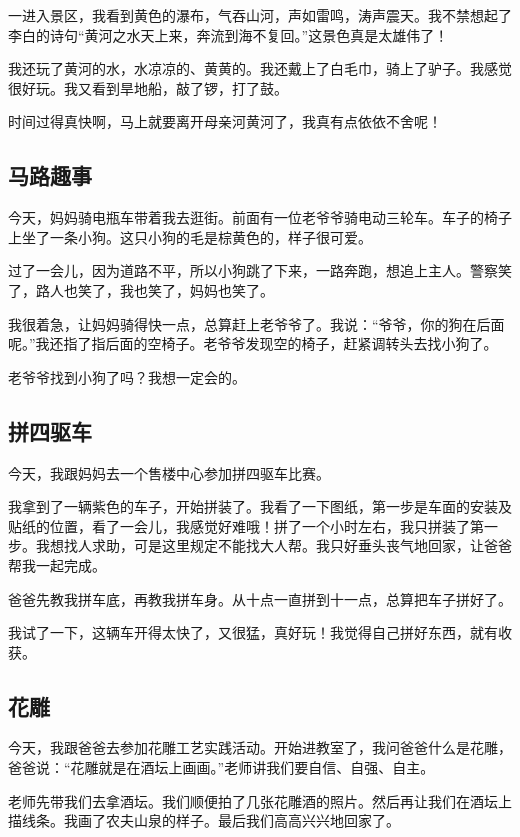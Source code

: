 \documentclass[UTF8,a4paper,titlepage,twoside,10.5pt]{article}
\begin{document}
一进入景区，我看到黄色的瀑布，气吞山河，声如雷鸣，涛声震天。我不禁想起了李白的诗句“黄河之水天上来，奔流到海不复回。”这景色真是太雄伟了！

我还玩了黄河的水，水凉凉的、黄黄的。我还戴上了白毛巾，骑上了驴子。我感觉很好玩。我又看到旱地船，敲了锣，打了鼓。

时间过得真快啊，马上就要离开母亲河黄河了，我真有点依依不舍呢！

\subsection{马路趣事}
\label{sec:orga0a0203}

今天，妈妈骑电瓶车带着我去逛街。前面有一位老爷爷骑电动三轮车。车子的椅子上坐了一条小狗。这只小狗的毛是棕黄色的，样子很可爱。

过了一会儿，因为道路不平，所以小狗跳了下来，一路奔跑，想追上主人。警察笑了，路人也笑了，我也笑了，妈妈也笑了。

我很着急，让妈妈骑得快一点，总算赶上老爷爷了。我说：“爷爷，你的狗在后面呢。”我还指了指后面的空椅子。老爷爷发现空的椅子，赶紧调转头去找小狗了。

老爷爷找到小狗了吗？我想一定会的。

\subsection{拼四驱车}
\label{sec:org8fdf703}

今天，我跟妈妈去一个售楼中心参加拼四驱车比赛。

我拿到了一辆紫色的车子，开始拼装了。我看了一下图纸，第一步是车面的安装及贴纸的位置，看了一会儿，我感觉好难哦！拼了一个小时左右，我只拼装了第一步。我想找人求助，可是这里规定不能找大人帮。我只好垂头丧气地回家，让爸爸帮我一起完成。

爸爸先教我拼车底，再教我拼车身。从十点一直拼到十一点，总算把车子拼好了。

我试了一下，这辆车开得太快了，又很猛，真好玩！我觉得自己拼好东西，就有收获。

\subsection{花雕}
\label{sec:org55cba40}

今天，我跟爸爸去参加花雕工艺实践活动。开始进教室了，我问爸爸什么是花雕，爸爸说：“花雕就是在酒坛上画画。”老师讲我们要自信、自强、自主。

老师先带我们去拿酒坛。我们顺便拍了几张花雕酒的照片。然后再让我们在酒坛上描线条。我画了农夫山泉的样子。最后我们高高兴兴地回家了。
\end{document}
